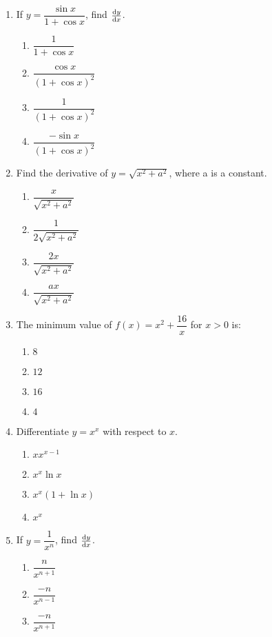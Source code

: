 \begin{multicols}{2}
\begin{enumerate}[label={\arabic*.}]
    \item If \(y = \dfrac{\sin x}{1+\cos x}\), find \(\frac{\mathrm{d}y}{\mathrm{d}x}\).
      \begin{enumerate}[label={\Alph*.}]
        \item \(\dfrac{1}{1+\cos x}\)
        \item \(\dfrac{\cos x}{{(1+\cos x)}^2}\)
        \item \(\dfrac{1}{{(1+\cos x)}^2}\)
        \item \(\dfrac{-\sin x}{{(1+\cos x)}^2}\)
      \end{enumerate}
    \item Find the derivative of \(y = \sqrt{x^2+a^2}\), where a is a constant.
      \begin{enumerate}[label={\Alph*.}]
        \item \(\dfrac{x}{\sqrt{x^2+a^2}}\)
        \item \(\dfrac{1}{2\sqrt{x^2+a^2}}\)
        \item \(\dfrac{2x}{\sqrt{x^2+a^2}}\)
        \item \(\dfrac{ax}{\sqrt{x^2+a^2}}\)
      \end{enumerate}
    \item The minimum value of \(f(x) = x^2 + \dfrac{16}{x}\) for \(x>0\) is:
      \begin{enumerate}[label={\Alph*.}]
        \item \(8\)
        \item \(12\)
        \item \(16\)
        \item \(4\)
      \end{enumerate}
    \item Differentiate \(y = x^x\) with respect to \(x\).
      \begin{enumerate}[label={\Alph*.}]
        \item \(x x^{x-1}\)
        \item \(x^x \ln x\)
        \item \(x^x (1+\ln x)\)
        \item \(x^x\)
      \end{enumerate}
    \item If \(y = \dfrac{1}{x^n}\), find \(\frac{\mathrm{d}y}{\mathrm{d}x}\).
      \begin{enumerate}[label={\Alph*.}]
        \item \(\dfrac{n}{x^{n+1}}\)
        \item \(\dfrac{-n}{x^{n-1}}\)
        \item \(\dfrac{-n}{x^{n+1}}\)

\end{enumerate}
\end{enumerate}
\end{multicols}
